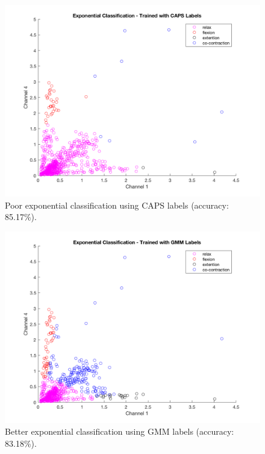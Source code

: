 \documentclass[times, 10pt,twocolumn]{article}
\begin{document}
\begin{figure}[h]
  \includegraphics[width=\linewidth]{Figures/f9.png}
  \caption{Poor exponential classification using CAPS labels (accuracy: 85.17\%).}
  \label{expCAPS}
\end{figure}

\begin{figure}[h]
  \includegraphics[width=\linewidth]{Figures/f10.png}
  \caption{Better exponential classification using GMM labels (accuracy: 83.18\%).}
  \label{expGMM}
\end{figure}
\end{document}
